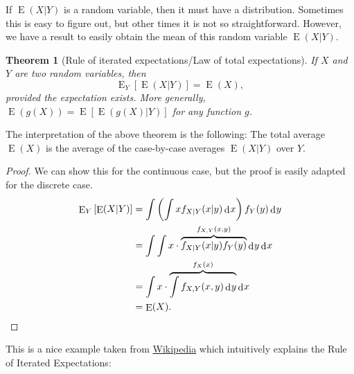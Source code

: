 \documentclass[
]{book}
\DeclareMathOperator{\E}{E}
\DeclareMathOperator{\dd}{d}
\newcommand{\dint}{\dd\hspace{0.5pt}\!}
\newtheorem{theorem}{Theorem}[chapter]
\theoremstyle{definition}
\theoremstyle{definition}
\theoremstyle{definition}
\theoremstyle{definition}
\theoremstyle{remark}
\begin{document}
If \(\E(X|Y)\) is a random variable, then it must have a distribution.
Sometimes this is easy to figure out, but other times it is not so straightforward.
However, we have a result to easily obtain the mean of this random variable \(\E(X|Y)\).

\begin{theorem}[Rule of iterated expectations/Law of total expectations]
\protect\hypertarget{thm:lawoftotalexp}{}\label{thm:lawoftotalexp}If \(X\) and \(Y\) are two random variables, then
\[
{\E}_Y\left[\E(X|Y)\right] = \E(X),
\]
provided the expectation exists.
More generally, \(\E(g(X)) = \E\left[\E(g(X)|Y)\right]\) for any function \(g\).
\end{theorem}

The interpretation of the above theorem is the following: The total average \(\E(X)\) is the average of the case-by-case averages \(\E(X|Y)\) over \(Y\).

\begin{proof}
We can show this for the continuous case, but the proof is easily adapted for the discrete case.
\begin{align*}
{\E}_Y\left[\E(X|Y)\right] 
&= \int \left( \int x f_{X|Y}(x|y)\dint x \right) f_Y(y)\dint y \\
&= \int \int x \cdot \overbrace{f_{X|Y}(x|y) f_Y(y)}^{f_{X,Y}(x,y)}  \dint y \dint x  \\
&= \int  x \cdot \overbrace{\int f_{X,Y}(x,y) \dint y}^{f_X(x)}   \dint x  \\
&= \E(X).
\end{align*}
\end{proof}

This is a nice example taken from \href{https://en.wikipedia.org/wiki/Law_of_total_expectation}{Wikipedia} which intuitively explains the Rule of Iterated Expectations:
\end{document}
